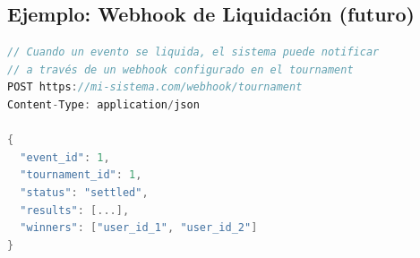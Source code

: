 \documentclass[12pt,a4paper]{article}
\begin{document}
\subsection{Ejemplo: Webhook de Liquidación (futuro)}
\begin{lstlisting}[language=c]
// Cuando un evento se liquida, el sistema puede notificar
// a través de un webhook configurado en el tournament
POST https://mi-sistema.com/webhook/tournament
Content-Type: application/json

{
  "event_id": 1,
  "tournament_id": 1,
  "status": "settled",
  "results": [...],
  "winners": ["user_id_1", "user_id_2"]
}
\end{lstlisting}
\end{document}
